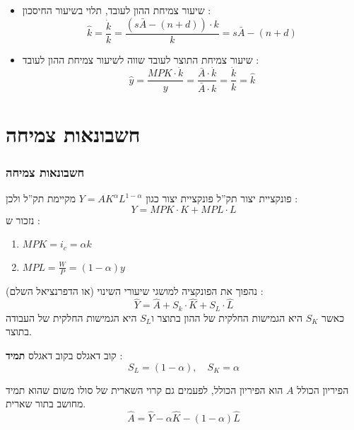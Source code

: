 \documentclass[usenames,dvipsnames]{beamer}
\begin{document}
\begin{RTL}
\begin{frame}[allowframebreaks]
\begin{itemize}
        \framebreak

        \item שיעור צמיחת ההון לעובד, תלוי בשיעור החיסכון : $$\widehat k = \frac{\dot k}{k} = \frac{\left(s \bar A - (n+d)\right) \cdot k}{k} = s \bar A - (n+d) $$
        \item שיעור צמיחת התוצר לעובד שווה לשיעור צמיחת ההון לעובד : $$\widehat y = \frac{MPK \cdot \dot k}{y} = \frac{\bar A \cdot \dot k }{\bar A \cdot k} = \frac{\dot k}{k} = \widehat k $$
        
    \end{itemize}


\end{frame}


\section{חשבונאות צמיחה}
\begin{frame}[allowframebreaks]
    \frametitle{חשבונאות צמיחה}
    \begin{block}{פונקציית יצור תק''ל}
        פונקציית יצור כגון $Y = A K^\alpha L^{1-\alpha}$ מקיימת תק''ל ולכן :
        $$Y = MPK \cdot K + MPL \cdot L$$
        נזכור ש : 
        \begin{enumerate}
            \item $MPK = i_c = \alpha k $
            \item $MPL = \frac{W}{P} =  (1-\alpha) y $
        \end{enumerate}

        נהפוך את הפונקציה למושגי שיעורי השינוי (או הדפרנציאל השלם) :
        $$\widehat Y = \widehat A + S_k \cdot \widehat K + S_L \cdot  \widehat L$$
        כאשר $S_K$ היא הגמישות החלקית של ההון בתוצר ו$S_L$ היא הגמישות החלקית של העבודה בתוצר.
    \end{block}

    \framebreak
    \begin{block}{קוב דאגלס}
        בקוב דאגלס \textbf{תמיד} :
        $$S_L = (1-\alpha), \quad S_K = \alpha$$
    \end{block}

    \begin{block}{הפיריון הכולל}
        $A$ הוא הפיריון הכולל, לפעמים גם קרוי השארית של סולו משום שהוא תמיד מחושב בתור שארית.
        $$
\widehat{A}=\widehat{Y}-\alpha \widehat{K}-(1-\alpha) \widehat{L}
$$
    \end{block}
    

\end{frame}


\end{RTL}
\end{document}
